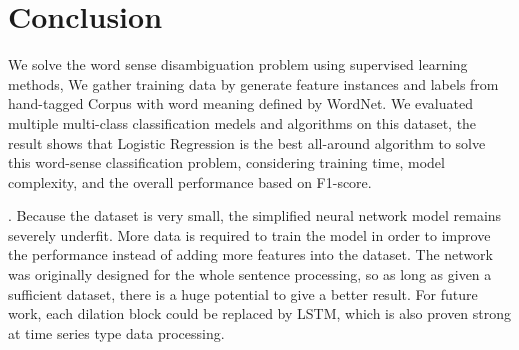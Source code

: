 \section{Conclusion}

We solve the word sense disambiguation problem using supervised learning
methods, 
We gather training data by generate feature instances and labels from
hand-tagged Corpus with word meaning defined by WordNet.
We evaluated multiple multi-class classification medels and algorithms on this
dataset, the result shows that Logistic Regression is the best all-around
algorithm to solve this word-sense classification problem, considering 
training time, model complexity, and the overall performance based on F1-score.

. 
Because the dataset is very small, the simplified neural
network model remains severely underfit. More data is required to train the
model in order to improve the performance instead of adding more features into
the dataset. The network was originally designed for the whole sentence
processing, so as long as given a sufficient dataset, there is a huge potential
to give a better result. For future work, each dilation block could be replaced
by LSTM, which is also proven strong at time series type data processing. 
